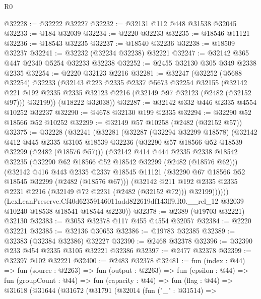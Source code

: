 \begin{lexlean}{R0}
\begin{coremodule}
@32228 := @32222 @32227
@32232 := @32131 @112 @448 @31538 @32045
@32233 := @184 @32039
@32234 := @2220 @32233
@32235 := @18546 @11121
@32236 := @18543 @32235
@32237 := @18540 @32236
@32238 := @18509 @32237
@32241 := @32232 (@32234 @32238) @32221
@32247 := @32142 @365 @447 @2340 @5254 @32233 @32238
@32252 := @2455 @32130 @305 @349 @2338 @2335
@32254 := @2220 @32123 @2216
@32281 := @32247
    (@32252
      (@5688 @32254)
      @32233
      (@32143
        @223
        @2335
        @2337
        @5673
        @32254
        @32155
        (@32142 @221 @192 @2335 @2335 @32123 @2216 (@32149 @97 @32123 (@2482 (@32152 @97))) @32199))
      (@18222 @32038))
@32287 := @32142 @332 @446 @2335 @4554 @10252 @32237
@32290 := @4678 @32130 @199 @2335
@32294 := @32290 @52 @18566 @52 @10252
@32299 := @32149 @57 @10258 (@2482 (@32152 @57))
@32375 := @32228
    (@32241
      (@32281
        (@32287
          (@32294 @32299 @18578)
          (@32142
            @412
            @445
            @2335
            @3105
            @18539
            @32236
            (@32290 @57 @18566 @52 @18539 @32299 (@2482 (@18576 @57)))
            (@32142
              @414
              @444
              @2335
              @2338
              @18542
              @32235
              (@32290 @62 @18566 @52 @18542 @32299 (@2482 (@18576 @62)))
              (@32142
                @416
                @443
                @2335
                @2337
                @18545
                @11121
                (@32290 @67 @18566 @52 @18545 @32299 (@2482 (@18576 @67)))
                (@32142
                  @211
                  @192
                  @2335
                  @2335
                  @2231
                  @2216
                  (@32149 @72 @2231 (@2482 (@32152 @72)))
                  @32199))))))
      (LexLeanPreserve.Cf40d62359146011add822619df143ff9.R0.__rel_12
        @32039
        @10240
        @18538
        @18541
        @18544
        @2230))
@32378 := @2389 (@19703 @32221) @32130
@32383 := @3053 @32378 @117 @455 @4554 @32057
@32384 := @2220 @32221
@32385 := @32136 @30653
@32386 := @19783 @32385
@32389 := @32383 (@32384 @32386) @32227
@32390 := @2468 @32378
@32396 := @32390 @233 @454 @2335 @3105 @32221 @32386
@32397 := @2477 @32378
@32399 := @32397 @102 @32221
@32400 := @2483 @32378
@32481 := fun (index : @44) =>
  fun (source : @2263) =>
  fun (output : @2263) =>
  fun (epsilon : @44) =>
  fun (groupCount : @44) =>
  fun (capacity : @44) =>
  fun (flag : @44) =>
  @31618
    (@31644
      (@31672
        (@31791
          (@32014
            (fun ("_" : @31514) =>

\end{coremodule}
\end{lexlean}
